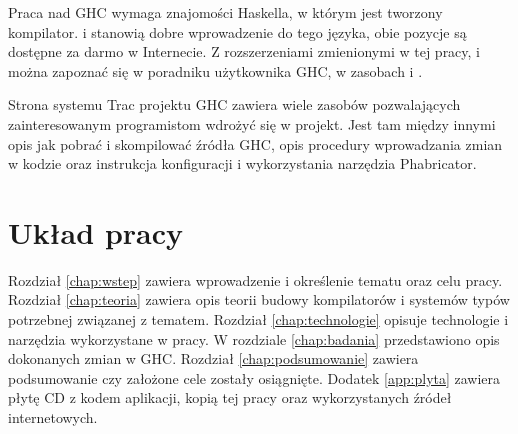Praca nad GHC wymaga znajomości Haskella, w którym jest tworzony
kompilator. \cite{LearnYouAHaskell} i \cite{RealWorldHaskell} stanowią dobre
wprowadzenie do tego języka, obie pozycje są dostępne za darmo w Internecie. Z
rozszerzeniami zmienionymi w tej pracy,  i
 można zapoznać się w poradniku użytkownika GHC, w
zasobach \cite{GuideTypeFamilies} i \cite{GuidePartialTypeSignatures}.

Strona systemu Trac projektu GHC zawiera wiele zasobów pozwalających
zainteresowanym programistom wdrożyć się w projekt. Jest tam między innymi opis
jak pobrać i skompilować źródła GHC\cite{WikiNewcomers}, opis procedury
wprowadzania zmian w kodzie\cite{WikiFixingBugs} oraz instrukcja konfiguracji i
wykorzystania narzędzia Phabricator\cite{WikiPhabricator}.

\section{Układ pracy}\label{sec:uklad_pracy}

Rozdział \ref{chap:wstep} zawiera wprowadzenie i określenie tematu oraz celu
pracy. Rozdział \ref{chap:teoria} zawiera opis teorii budowy kompilatorów i
systemów typów potrzebnej związanej z tematem. Rozdział \ref{chap:technologie}
opisuje technologie i narzędzia wykorzystane w pracy. W rozdziale
\ref{chap:badania} przedstawiono opis dokonanych zmian w GHC. Rozdział
\ref{chap:podsumowanie} zawiera podsumowanie czy założone cele zostały
osiągnięte. Dodatek \ref{app:plyta} zawiera płytę CD z kodem aplikacji,
kopią tej pracy oraz wykorzystanych źródeł internetowych.
